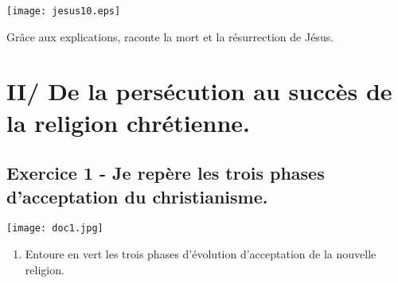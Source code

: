 \documentclass{beamer}
\begin{document}
    \begin{frame}
    \texttt{[image: jesus10.eps]} \\
    \end{frame}
   
   \begin{frame}
   Grâce aux explications, raconte la mort et la résurrection de Jésus.
   \end{frame}
   
  
 
    
   
     
    \section{II/ De la persécution au succès de la religion chrétienne.}
     
    \subsection{ Exercice 1 - Je repère les trois phases d'acceptation du christianisme.}
     
     \begin{frame}
     \texttt{[image: doc1.jpg]}
          \begin{enumerate}
          \item Entoure en vert les trois phases d'évolution d'acceptation de la nouvelle religion.
          \end{enumerate}
     \end{frame}
     
\end{document}
